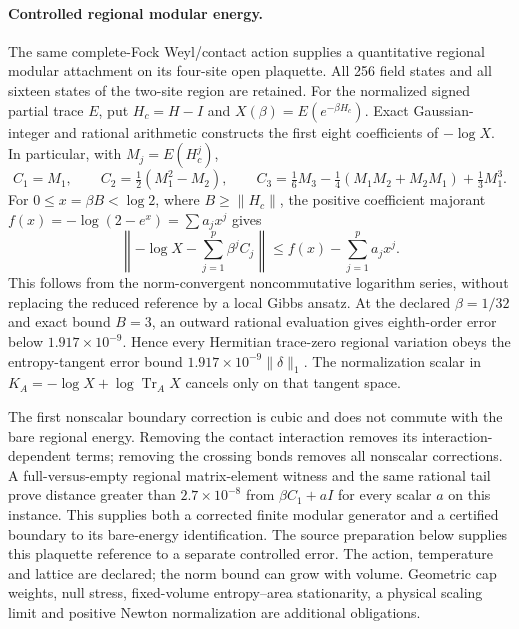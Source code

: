 \paragraph{Controlled regional modular energy.}
The same complete-Fock Weyl/contact action supplies a quantitative
regional modular attachment on its four-site open plaquette. All 256 field
states and all sixteen states of the two-site region are retained. For the
normalized signed partial trace $E$, put $H_c=H-I$ and
$X(\beta)=E(e^{-\beta H_c})$. Exact Gaussian-integer and rational arithmetic
constructs the first eight coefficients of $-\log X$. In particular, with
$M_j=E(H_c^j)$,
\[
 C_1=M_1,\qquad C_2=\tfrac12(M_1^2-M_2),\qquad
 C_3=\tfrac16 M_3-\tfrac14(M_1M_2+M_2M_1)+\tfrac13 M_1^3.
\]
For $0\leq x=\beta B<\log2$, where $B\geq\lVert H_c\rVert$, the positive
coefficient majorant $f(x)=-\log(2-e^x)=\sum a_jx^j$ gives
\[
 \left\lVert-\log X-\sum_{j=1}^{p}\beta^j C_j\right\rVert
 \leq f(x)-\sum_{j=1}^{p}a_jx^j.
\]
This follows from the norm-convergent noncommutative logarithm series,
without replacing the reduced reference by a local Gibbs ansatz. At the
declared $\beta=1/32$ and exact bound $B=3$, an outward rational evaluation
gives eighth-order error below $1.917\times10^{-9}$. Hence every Hermitian
trace-zero regional variation obeys the entropy-tangent error bound
$1.917\times10^{-9}\lVert\delta\rVert_1$. The normalization scalar in
$K_A=-\log X+\log\operatorname{Tr}_A X$ cancels only on that tangent space.

The first nonscalar boundary correction is cubic and does not commute
with the bare regional energy. Removing the contact interaction removes
its interaction-dependent terms; removing the crossing bonds removes all
nonscalar corrections. A full-versus-empty regional matrix-element
witness and the same rational tail prove distance greater than
$2.7\times10^{-8}$ from $\beta C_1+aI$ for every scalar $a$ on this
instance. This supplies both a corrected finite modular generator and a
certified boundary to its bare-energy identification. The source preparation
below supplies this plaquette reference to a separate controlled error. The action,
temperature and lattice are declared; the norm bound can grow with
volume. Geometric cap weights, null stress, fixed-volume entropy--area
stationarity, a physical scaling limit and positive Newton normalization
are additional obligations.
